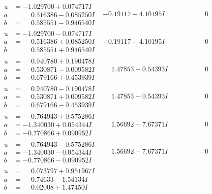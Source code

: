 \documentclass[1p]{elsarticle_modified}
\theoremstyle{definition}
\begin{document}
$$\begin{array}{c|c|c}
\begin{aligned}
u &= -1.029700 + 0.074717 I \\
a &= \phantom{-}0.516386 - 0.085250 I \\
b &= \phantom{-}0.585551 - 0.946540 I\end{aligned}
 & -0.19117 - 4.10195 I & \phantom{-0.000000 } 0 \\ \hline\begin{aligned}
u &= -1.029700 - 0.074717 I \\
a &= \phantom{-}0.516386 + 0.085250 I \\
b &= \phantom{-}0.585551 + 0.946540 I\end{aligned}
 & -0.19117 + 4.10195 I & \phantom{-0.000000 } 0 \\ \hline\begin{aligned}
u &= \phantom{-}0.940780 + 0.190478 I \\
a &= \phantom{-}0.530871 - 0.009582 I \\
b &= \phantom{-}0.679166 + 0.453939 I\end{aligned}
 & \phantom{-}1.47853 + 0.54393 I & \phantom{-0.000000 } 0 \\ \hline\begin{aligned}
u &= \phantom{-}0.940780 - 0.190478 I \\
a &= \phantom{-}0.530871 + 0.009582 I \\
b &= \phantom{-}0.679166 - 0.453939 I\end{aligned}
 & \phantom{-}1.47853 - 0.54393 I & \phantom{-0.000000 } 0 \\ \hline\begin{aligned}
u &= \phantom{-}0.764943 + 0.575286 I \\
a &= -1.340030 + 0.054344 I \\
b &= -0.770866 + 0.090952 I\end{aligned}
 & \phantom{-}1.56692 + 7.67371 I & \phantom{-0.000000 } 0 \\ \hline\begin{aligned}
u &= \phantom{-}0.764943 - 0.575286 I \\
a &= -1.340030 - 0.054344 I \\
b &= -0.770866 - 0.090952 I\end{aligned}
 & \phantom{-}1.56692 - 7.67371 I & \phantom{-0.000000 } 0 \\ \hline\begin{aligned}
u &= \phantom{-}0.073797 + 0.951967 I \\
a &= \phantom{-}0.74633 - 1.54134 I \\
b &= \phantom{-}0.02008 + 1.47450 I\end{aligned}

\end{array}$$
\end{document}
